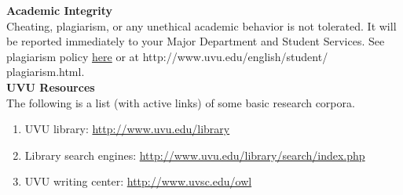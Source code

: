 \documentclass[11pt]{article}
\begin{document}
   {\bf Academic Integrity}\\
 Cheating, plagiarism, or any unethical academic behavior is not tolerated. It will be reported immediately to 
your Major Department and Student Services. See plagiarism policy 
\href{http://www.uvu.edu/english/student/plagiarism.html}{here} or at http://www.uvu.edu/english/student/
plagiarism.html.
 \\
  
  
  {\bf UVU Resources}\\
  The following is a list (with active links) of some basic research corpora.
  \begin{enumerate}
\item UVU library: \href{http://www.uvu.edu/library}{http://www.uvu.edu/library}
\item Library search engines: \href{http://www.uvu.edu/library/search/index.php}
{http://www.uvu.edu/library/search/index.php}
\item UVU writing center: \href{http://www.uvsc.edu/owl}{http://www.uvsc.edu/owl}
\end{enumerate}


\end{document}
